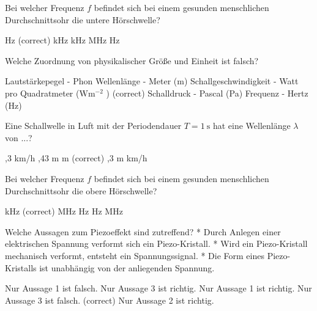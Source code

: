 \documentclass[11pt]{exam}
\begin{document}
\setlength{\voffset}{-0.5in}
\setlength{\headsep}{5pt}

\hspace{2mm}
 \hspace{5mm}
\vspace{4mm}

\begin{questions}

\question Bei welcher Frequenz \( f \) befindet sich bei einem gesunden menschlichen Durchschnittsohr die untere Hörschwelle?

\begin{choices}
	 Hz (correct)
	 kHz
	 kHz
	 MHz
	 Hz
\end{choices}

\vspace{3mm}\question Welche Zuordnung von physikalischer Größe und Einheit ist falsch?

\begin{choices}
	\choice Lautstärkepegel - Phon
	\choice Wellenlänge - Meter (m)
	\choice Schallgeschwindigkeit - Watt pro Quadratmeter (\( \mathrm{W m^{-2}} \) ) (correct)
	\choice Schalldruck - Pascal (Pa)
	\choice Frequenz - Hertz (Hz)
\end{choices}

\vspace{3mm}\question Eine Schallwelle in Luft mit der Periodendauer \( T= \mathrm{1~s} \) hat eine Wellenlänge \( \lambda \) von ...?

\begin{choices}
	,3 km/h
	,43 m
	 m (correct)
	,3 m
	 km/h
\end{choices}

\vspace{3mm}\question Bei welcher Frequenz \( f \) befindet sich bei einem gesunden menschlichen Durchschnittsohr die obere Hörschwelle?

\begin{choices}
	 kHz (correct)
	 MHz
	 Hz
	 Hz
	 MHz
\end{choices}

\vspace{3mm}\question Welche Aussagen zum Piezoeffekt sind zutreffend?	* Durch Anlegen einer elektrischen Spannung verformt sich ein Piezo-Kristall.	* Wird ein Piezo-Kristall mechanisch verformt, entsteht ein Spannungssignal.	* Die Form eines Piezo-Kristalls ist unabhängig von der anliegenden Spannung.

\begin{choices}
	\choice Nur Aussage 1 ist falsch.
	\choice Nur Aussage 3 ist richtig.
	\choice Nur Aussage 1 ist richtig.
	\choice Nur Aussage 3 ist falsch. (correct)
	\choice Nur Aussage 2 ist richtig.
\end{choices}

\vspace{3mm}\end{questions}
\end{document}
